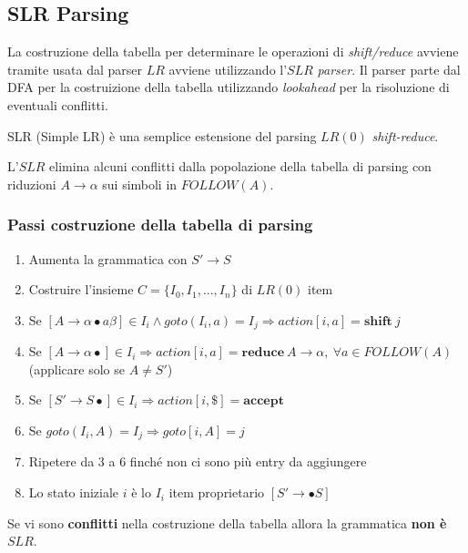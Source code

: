 \subsection{SLR Parsing}
La costruzione della tabella per determinare le operazioni di
\textit{shift/reduce} avviene tramite usata dal parser $LR$ avviene utilizzando
l'$SLR$ \textit{parser}. Il parser parte dal DFA per la costruizione della
tabella utilizzando \textit{lookahead} per la risoluzione di eventuali
conflitti.

\begin{definition}[SLR]
SLR (Simple LR) \`e una semplice estensione del parsing $LR(0)$
\textit{shift-reduce}.
\end{definition}

L'$SLR$ elimina alcuni conflitti dalla popolazione della tabella di parsing con
riduzioni $A \to \alpha$ sui simboli in $FOLLOW(A)$.

\subsubsection{Passi costruzione della tabella di parsing}
\label{sec:step_parsing_table_construction_LR0}
\begin{enumerate}
\item Aumenta la grammatica con $S' \to S$
\item Costruire l'insieme $C = \{I_0,I_1,...,I_n\}$ di $LR(0)$ item
\item Se $[A \to \alpha\bullet a\beta] \in I_i \land goto(I_i,a)=I_j
\Rightarrow action[i,a] = \mathbf{shift} \ j$
\item Se $[A \to \alpha\bullet] \in I_i \Rightarrow action[i,a]=\mathbf{reduce}
\ A \to \alpha, \ \forall a \in FOLLOW(A)$ (applicare solo se $A \neq S'$)
\item Se $[S' \to S\bullet] \in I_i \Rightarrow action[i,\$] = \mathbf{accept}$
\item Se $goto(I_i,A)=I_j \Rightarrow goto[i,A]=j$
\item Ripetere da 3 a 6 finch\'e non ci sono pi\`u entry da aggiungere
\item Lo stato iniziale $i$ \`e lo $I_i$ item proprietario $[S' \to \bullet S]$
\end{enumerate}

Se vi sono \textbf{conflitti} nella costruzione della tabella allora la
grammatica \textbf{non \`e} $SLR$.

